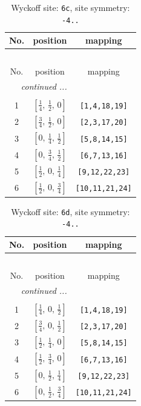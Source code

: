 \documentclass[fleqn,8pt]{jsarticle}
\begin{document}
\renewcommand{\arraystretch}{1.2}
\begin{longtable}{ccc}
\caption{Wyckoff site: {\tt 6c}, site symmetry: {\tt -4..}}
 \\
 \hline \hline
No. & position & mapping \\ \hline \endfirsthead

\multicolumn{2}{l}{\tablename\ \thetable{}} \\
 \hline \hline
No. & position & mapping \\ \hline \endhead

 \hline \hline
\multicolumn{2}{r}{\footnotesize\it continued ...} \\ \endfoot

 \hline \hline
\multicolumn{2}{r}{} \\ \endlastfoot

1 & $\left[ \frac{1}{4},\, \frac{1}{2},\, 0 \right]$ & {\tt [1,4,18,19]} \\ \hline
2 & $\left[ \frac{3}{4},\, \frac{1}{2},\, 0 \right]$ & {\tt [2,3,17,20]} \\ \hline
3 & $\left[ 0,\, \frac{1}{4},\, \frac{1}{2} \right]$ & {\tt [5,8,14,15]} \\ \hline
4 & $\left[ 0,\, \frac{3}{4},\, \frac{1}{2} \right]$ & {\tt [6,7,13,16]} \\ \hline
5 & $\left[ \frac{1}{2},\, 0,\, \frac{1}{4} \right]$ & {\tt [9,12,22,23]} \\ \hline
6 & $\left[ \frac{1}{2},\, 0,\, \frac{3}{4} \right]$ & {\tt [10,11,21,24]} \\
\end{longtable}
\renewcommand{\arraystretch}{1.2}
\begin{longtable}{ccc}
\caption{Wyckoff site: {\tt 6d}, site symmetry: {\tt -4..}}
 \\
 \hline \hline
No. & position & mapping \\ \hline \endfirsthead

\multicolumn{2}{l}{\tablename\ \thetable{}} \\
 \hline \hline
No. & position & mapping \\ \hline \endhead

 \hline \hline
\multicolumn{2}{r}{\footnotesize\it continued ...} \\ \endfoot

 \hline \hline
\multicolumn{2}{r}{} \\ \endlastfoot

1 & $\left[ \frac{1}{4},\, 0,\, \frac{1}{2} \right]$ & {\tt [1,4,18,19]} \\ \hline
2 & $\left[ \frac{3}{4},\, 0,\, \frac{1}{2} \right]$ & {\tt [2,3,17,20]} \\ \hline
3 & $\left[ \frac{1}{2},\, \frac{1}{4},\, 0 \right]$ & {\tt [5,8,14,15]} \\ \hline
4 & $\left[ \frac{1}{2},\, \frac{3}{4},\, 0 \right]$ & {\tt [6,7,13,16]} \\ \hline
5 & $\left[ 0,\, \frac{1}{2},\, \frac{1}{4} \right]$ & {\tt [9,12,22,23]} \\ \hline
6 & $\left[ 0,\, \frac{1}{2},\, \frac{3}{4} \right]$ & {\tt [10,11,21,24]} \\
\end{longtable}
\end{document}
